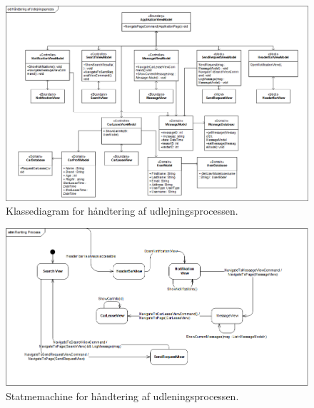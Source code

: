 \documentclass[Arkitektur/System_main.tex]{subfiles}
\begin{document}
\begin{figure}[H]
    \centering
    \includegraphics[width=1\textwidth]{Arkitektur/Softwarearkitektur/Leasing/graphics/Leasing_processCD.png}
    \caption{Klassediagram for håndtering af udlejningsprocessen.}
    \label{fig:Leasing_processCD}
\end{figure}

\begin{figure}[H]
    \centering
    \includegraphics[width=1\textwidth]{Arkitektur/Softwarearkitektur/Leasing/graphics/Leasing_processSTM.png}
    \caption{Statmemachine for håndtering af udleningsprocessen. }
    \label{fig:Leasing_processSTM}
\end{figure}
\end{document}
